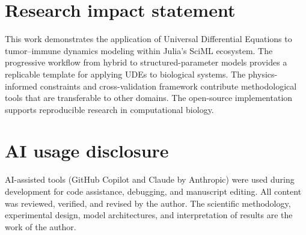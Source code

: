 \documentclass{juliacon}
\begin{document}
\section{Research impact statement}
\label{sec:research-impact-statement}

This work demonstrates the application of Universal Differential Equations to tumor--immune dynamics modeling within Julia's SciML ecosystem. The progressive workflow from hybrid to structured-parameter models provides a replicable template for applying UDEs to biological systems. The physics-informed constraints and cross-validation framework contribute methodological tools that are transferable to other domains. The open-source implementation supports reproducible research in computational biology.

\section{AI usage disclosure}
\label{sec:ai-usage-disclosure}

AI-assisted tools (GitHub Copilot and Claude by Anthropic) were used during development for code assistance, debugging, and manuscript editing. All content was reviewed, verified, and revised by the author. The scientific methodology, experimental design, model architectures, and interpretation of results are the work of the author.



\end{document}
